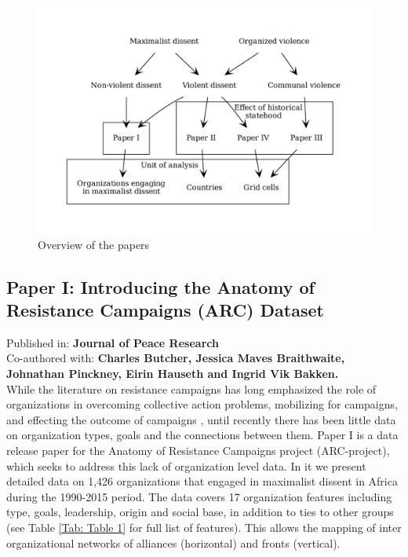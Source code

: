 \begin{figure}[hpbt]
	\centering
	\includegraphics[width=\textwidth]{img/flow.pdf}
	\caption{Overview of the papers}
	\label{flow}
\end{figure}

\subsection{Paper I: Introducing the Anatomy of Resistance Campaigns (ARC) Dataset}
\label{Paper 1}

Published in: \textbf{Journal of Peace Research}\\
Co-authored with: \textbf{Charles Butcher, Jessica Maves Braithwaite,\\
	Johnathan Pinckney, Eirin Hauseth and Ingrid Vik Bakken.}\\

While the literature on resistance campaigns has long emphasized the role of
organizations in overcoming collective action problems, mobilizing for
campaigns, and effecting the outcome of campaigns \citep{Braithwaite2020,
	Brancati2016, Butcher_2014, Celestino_2013, chenoweth2011civil,
HaggardStephan2016DaD:, TarrowSidneyG.2011Pim:}, until recently there has been
little data on organization types, goals and the connections between them. Paper
I is a data release paper for the Anatomy of Resistance Campaigns project
(ARC-project), which seeks to address this lack of organization level data. In
it we present detailed data on 1,426 organizations that engaged in maximalist
dissent in Africa during the 1990-2015 period. The data covers 17 organization
features including type, goals, leadership, origin and social base, in addition
to ties to other groups (see Table \ref{Tab: Table 1} for full list of
features). This allows the mapping of inter organizational networks of alliances
(horizontal) and fronts (vertical).

